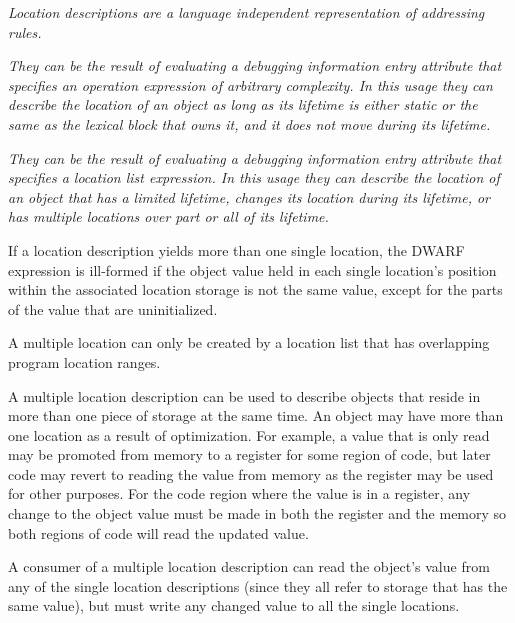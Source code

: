 \textit{Location descriptions are a language independent representation of
addressing rules.}

\textit{They can be the result of evaluating a debugging information entry
attribute that specifies an operation expression of arbitrary
complexity. In this usage they can describe the location of an object
as long as its lifetime is either static or the same as the lexical
block that owns it, and it does not move during its lifetime.}

\textit{They can be the result of evaluating a debugging information entry
attribute that specifies a location list expression. In this usage they
can describe the location of an object that has a limited lifetime,
changes its location during its lifetime, or has multiple locations over
part or all of its lifetime.}

If a location description yields more than one single location,
the DWARF expression is ill-formed if the object value held in each
single location’s position within the associated location
storage is not the same value, except for the parts of the value that
are uninitialized.

A multiple location can only be created by a location list that has
overlapping program location ranges.

A multiple location description can be used to describe objects that
reside in more than one piece of storage at the same time. An object
may have more than one location as a result of optimization. For
example, a value that is only read may be promoted from memory to a
register for some region of code, but later code may revert to reading
the value from memory as the register may be used for other purposes.
For the code region where the value is in a register, any change to
the object value must be made in both the register and the memory so
both regions of code will read the updated value.

A consumer of a multiple location description can read the object’s
value from any of the single location descriptions (since they all
refer to storage that has the same value), but must write any changed
value to all the single locations.

